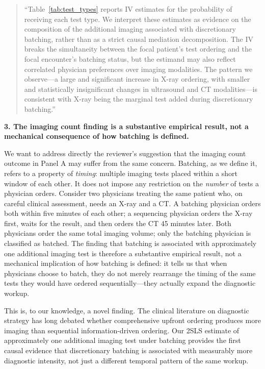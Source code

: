 \documentclass[11pt]{article}
\newcommand{\1}{\hbox{\rm 1\kern-.35em 1}}
\begin{document}
\begin{quote}
``Table~\ref{tab:test_types} reports IV estimates for the probability of receiving each test type. We interpret these estimates as evidence on the composition of the additional imaging associated with discretionary batching, rather than as a strict causal mediation decomposition. The IV breaks the simultaneity between the focal patient's test ordering and the focal encounter's batching status, but the estimand may also reflect correlated physician preferences over imaging modalities. The pattern we observe---a large and significant increase in X-ray ordering, with smaller and statistically insignificant changes in ultrasound and CT modalities---is consistent with X-ray being the marginal test added during discretionary batching.''
\end{quote}

\textbf{3. The imaging count finding is a substantive empirical result, not a mechanical consequence of how batching is defined.}

We want to address directly the reviewer's suggestion that the imaging count outcome in Panel A may suffer from the same concern. Batching, as we define it, refers to a property of \textit{timing}: multiple imaging tests placed within a short window of each other. It does not impose any restriction on the \textit{number} of tests a physician orders. Consider two physicians treating the same patient who, on careful clinical assessment, needs an X-ray and a CT. A batching physician orders both within five minutes of each other; a sequencing physician orders the X-ray first, waits for the result, and then orders the CT 45 minutes later. Both physicians order the same total imaging volume; only the batching physician is classified as batched. The finding that batching is associated with approximately one additional imaging test is therefore a substantive empirical result, not a mechanical implication of how batching is defined: it tells us that when physicians choose to batch, they do not merely rearrange the timing of the same tests they would have ordered sequentially---they actually expand the diagnostic workup.

This is, to our knowledge, a novel finding. The clinical literature on diagnostic strategy has long debated whether comprehensive upfront ordering produces more imaging than sequential information-driven ordering. Our 2SLS estimate of approximately one additional imaging test under batching provides the first causal evidence that discretionary batching is associated with measurably more diagnostic intensity, not just a different temporal pattern of the same workup.
\end{document}
